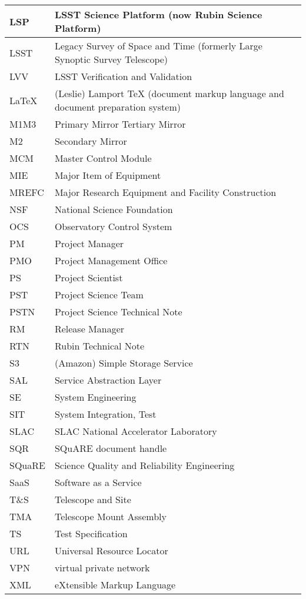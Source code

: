 \begin{longtable}{p{}p{}}
LSP & LSST Science Platform (now Rubin Science Platform) \\\hline
LSST & Legacy Survey of Space and Time (formerly Large Synoptic Survey Telescope) \\\hline
LVV & LSST Verification and Validation \\\hline
LaTeX & (Leslie) Lamport TeX (document markup language and document preparation system) \\\hline
M1M3 & Primary Mirror Tertiary Mirror \\\hline
M2 & Secondary Mirror \\\hline
MCM & Master Control Module \\\hline
MIE & Major Item of Equipment \\\hline
MREFC & Major Research Equipment and Facility Construction \\\hline
NSF & National Science Foundation \\\hline
OCS & Observatory Control System \\\hline
PM & Project Manager \\\hline
PMO & Project Management Office \\\hline
PS & Project Scientist \\\hline
PST & Project Science Team \\\hline
PSTN & Project Science Technical Note \\\hline
RM & Release Manager \\\hline
RTN & Rubin Technical Note \\\hline
S3 & (Amazon) Simple Storage Service  \\\hline
SAL & Service Abstraction Layer \\\hline
SE & System Engineering \\\hline
SIT & System Integration, Test \\\hline
SLAC & SLAC National Accelerator Laboratory \\\hline
SQR & SQuARE document handle \\\hline
SQuaRE & Science Quality and Reliability Engineering \\\hline
SaaS & Software as a Service \\\hline
T\&S & Telescope and Site \\\hline
TMA & Telescope Mount Assembly \\\hline
TS & Test Specification \\\hline
URL & Universal Resource Locator \\\hline
VPN & virtual private network \\\hline
XML & eXtensible Markup Language \\\hline
\end{longtable}
